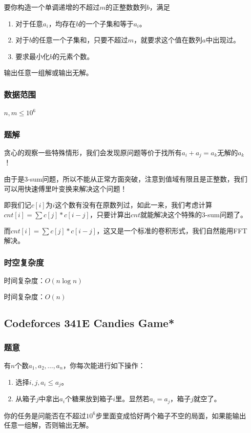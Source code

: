 \documentclass{ctexart}
\begin{document}
要你构造一个单调递增的不超过$m$的正整数数列$b$，满足
\begin{enumerate}
\item 对于任意$a_i$，均存在$b$的一个子集和等于$a_i$。
\item 对于$b$的任意一个子集和，只要不超过$m$，就要求这个值在数列$a$中出现过。
\item 要求最小化$b$的元素个数。
\end{enumerate}

输出任意一组解或输出无解。
\subsubsection{数据范围}
$n,m \le 10^6$
\subsubsection{题解}
贪心的观察一些特殊情形，我们会发现原问题等价于找所有$a_i+a_j=a_k$无解的$a_k$！

由于是3-sum问题，所以不能从正常方面突破，注意到值域有限且是正整数，我们可以用快速傅里叶变换来解决这个问题！

即我们记$c[i]$为$i$这个数有没有在原数列过，如此一来，我们考虑计算$cnt[i]=\sum c[j]*c[i-j]$，只要计算出$cnt$就能解决这个特殊的3-sum问题了。

而$cnt[i]=\sum c[j]*c[i-j]$，这又是一个标准的卷积形式，我们自然能用FFT解决。
\subsubsection{时空复杂度}
时间复杂度：$O(n \log n)$

时间复杂度：$O(n)$
\subsection{Codeforces 341E Candies Game*}
\subsubsection{题意}
有$n$个数$a_1,a_2,\ldots,a_n$，你每次能进行如下操作：

\begin{enumerate}
\item 选择$i,j,a_i \le a_j$。
\item 从箱子$j$中拿出$a_i$个糖果放到箱子$i$里。显然若$a_i=a_j$，箱子$j$就空了。
\end{enumerate}

你的任务是问能否在不超过$10^6$步里面变成恰好两个箱子不空的局面，如果能输出任意一组解，否则输出无解。
\end{document}
